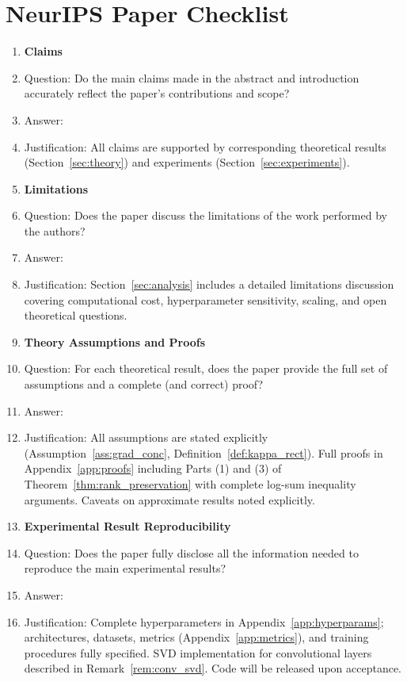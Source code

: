 \documentclass{article}
\begin{document}

\newpage
\section*{NeurIPS Paper Checklist}

\begin{enumerate}

\item {\bf Claims}
    \item[] Question: Do the main claims made in the abstract and introduction accurately reflect the paper's contributions and scope?
    \item[] Answer: \answerYes{}
    \item[] Justification: All claims are supported by corresponding theoretical results (Section~\ref{sec:theory}) and experiments (Section~\ref{sec:experiments}).

\item {\bf Limitations}
    \item[] Question: Does the paper discuss the limitations of the work performed by the authors?
    \item[] Answer: \answerYes{}
    \item[] Justification: Section~\ref{sec:analysis} includes a detailed limitations discussion covering computational cost, hyperparameter sensitivity, scaling, and open theoretical questions.

\item {\bf Theory Assumptions and Proofs}
    \item[] Question: For each theoretical result, does the paper provide the full set of assumptions and a complete (and correct) proof?
    \item[] Answer: \answerYes{}
    \item[] Justification: All assumptions are stated explicitly (Assumption~\ref{ass:grad_conc}, Definition~\ref{def:kappa_rect}). Full proofs in Appendix~\ref{app:proofs} including Parts (1) and (3) of Theorem~\ref{thm:rank_preservation} with complete log-sum inequality arguments. Caveats on approximate results noted explicitly.

\item {\bf Experimental Result Reproducibility}
    \item[] Question: Does the paper fully disclose all the information needed to reproduce the main experimental results?
    \item[] Answer: \answerYes{}
    \item[] Justification: Complete hyperparameters in Appendix~\ref{app:hyperparams}; architectures, datasets, metrics (Appendix~\ref{app:metrics}), and training procedures fully specified. SVD implementation for convolutional layers described in Remark~\ref{rem:conv_svd}. Code will be released upon acceptance.


\end{enumerate}
\end{document}

